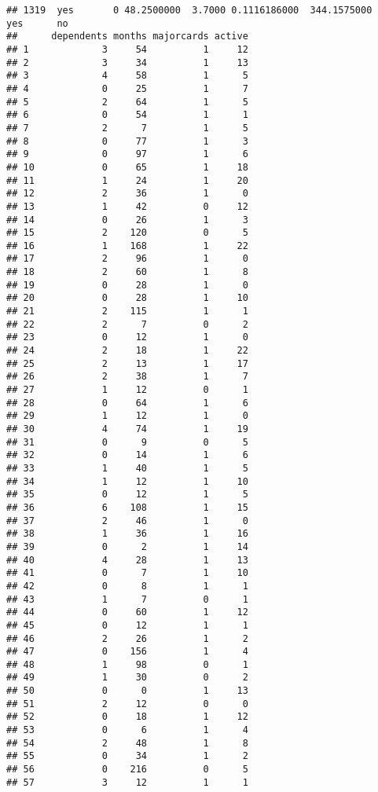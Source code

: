 \documentclass[]{article}
\begin{document}
\begin{verbatim}
## 1319  yes       0 48.2500000  3.7000 0.1116186000  344.1575000   yes      no
##      dependents months majorcards active
## 1             3     54          1     12
## 2             3     34          1     13
## 3             4     58          1      5
## 4             0     25          1      7
## 5             2     64          1      5
## 6             0     54          1      1
## 7             2      7          1      5
## 8             0     77          1      3
## 9             0     97          1      6
## 10            0     65          1     18
## 11            1     24          1     20
## 12            2     36          1      0
## 13            1     42          0     12
## 14            0     26          1      3
## 15            2    120          0      5
## 16            1    168          1     22
## 17            2     96          1      0
## 18            2     60          1      8
## 19            0     28          1      0
## 20            0     28          1     10
## 21            2    115          1      1
## 22            2      7          0      2
## 23            0     12          1      0
## 24            2     18          1     22
## 25            2     13          1     17
## 26            2     38          1      7
## 27            1     12          0      1
## 28            0     64          1      6
## 29            1     12          1      0
## 30            4     74          1     19
## 31            0      9          0      5
## 32            0     14          1      6
## 33            1     40          1      5
## 34            1     12          1     10
## 35            0     12          1      5
## 36            6    108          1     15
## 37            2     46          1      0
## 38            1     36          1     16
## 39            0      2          1     14
## 40            4     28          1     13
## 41            0      7          1     10
## 42            0      8          1      1
## 43            1      7          0      1
## 44            0     60          1     12
## 45            0     12          1      1
## 46            2     26          1      2
## 47            0    156          1      4
## 48            1     98          0      1
## 49            1     30          0      2
## 50            0      0          1     13
## 51            2     12          0      0
## 52            0     18          1     12
## 53            0      6          1      4
## 54            2     48          1      8
## 55            0     34          1      2
## 56            0    216          0      5
## 57            3     12          1      1

\end{verbatim}
\end{document}
